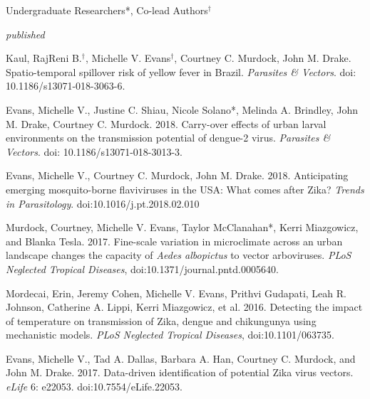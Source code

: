 


\bigskip
Undergraduate Researchers*, Co-lead Authors$^\dagger$

\smallskip

\textit{published}
\smallskip

\begin{etaremune}

\item Kaul, RajReni B.$^\dagger$, \textcolor{awesome}{Michelle V. Evans}$^\dagger$, Courtney C. Murdock, John M. Drake. Spatio-temporal spillover risk of yellow fever in Brazil. \textit{Parasites \& Vectors}. doi: 10.1186/s13071-018-3063-6.
\smallskip

\item \textcolor{awesome}{Evans, Michelle V.}, Justine C. Shiau, Nicole Solano*, Melinda A. Brindley, John M. Drake, Courtney C. Murdock. 2018. Carry-over effects of urban larval environments on the transmission potential of dengue-2 virus. \textit{Parasites \& Vectors}. doi: 10.1186/s13071-018-3013-3.

\item \textcolor{awesome}{Evans, Michelle V.}, Courtney C. Murdock, John M. Drake. 2018. Anticipating emerging mosquito-borne flaviviruses in the USA: What comes after Zika? \textit{Trends in Parasitology}. doi:10.1016/j.pt.2018.02.010

\item Murdock, Courtney, \textcolor{awesome}{Michelle V. Evans}, Taylor McClanahan*, Kerri Miazgowicz, and Blanka Tesla. 2017. Fine-scale variation in microclimate across an urban landscape changes the capacity of \textit{Aedes albopictus} to vector arboviruses. \textit{PLoS Neglected Tropical Diseases}, doi:10.1371/journal.pntd.0005640.
\smallskip

\item Mordecai, Erin, Jeremy Cohen, \textcolor{awesome}{Michelle V. Evans}, Prithvi Gudapati, Leah R. Johnson, Catherine A. Lippi, Kerri Miazgowicz, et al. 2016. Detecting the impact of temperature on transmission of Zika, dengue and chikungunya using mechanistic models. \textit{PLoS Neglected Tropical Diseases}, doi:10.1101/063735.
\smallskip

\item \textcolor{awesome}{Evans, Michelle V.}, Tad A. Dallas, Barbara A. Han, Courtney C. Murdock, and John M. Drake. 2017. Data-driven identification of potential Zika virus vectors. \textit{eLife} 6: e22053. doi:10.7554/eLife.22053.
\end{etaremune}

\bigskip
